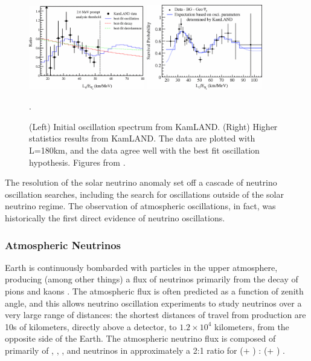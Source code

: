 \begin{figure}[htbp]
  \centering
  \includegraphics[width=0.45\textwidth]{intro_figures/kamland.png}
  \includegraphics[width=0.45\textwidth]{intro_figures/kamland_highstats.png}
  \caption[KamLAND Oscillation Results]{(Left) Initial oscillation spectrum from KamLAND. (Right) Higher statistics results from KamLAND.  The data are plotted with L=180km, and the data agree well with the best fit oscillation hypothesis. Figures from \cite{Araki:2004mb,Abe:2008aa}.}
  \label{fig:kamland}.
\end{figure}

The resolution of the solar neutrino anomaly set off a cascade of neutrino oscillation searches, including the search for oscillations outside of the solar neutrino regime.  The observation of atmospheric oscillations, in fact, was historically the first direct evidence of neutrino oscillations.

\subsubsection{Atmospheric Neutrinos}

Earth is continuously bombarded with particles in the upper atmosphere, producing (among other things) a flux of neutrinos primarily from the decay of pions and kaons \cite{Honda:2004yz, PhysRevD.70.023006, Plyaskin:2001ku}.  The atmospheric flux is often predicted as a function of zenith angle, and this allows neutrino oscillation experiments to study neutrinos over a very large range of distances: the shortest distances of travel from production are 10s of kilometers, directly above a detector, to $1.2 \times 10^4$ kilometers, from the opposite side of the Earth.  The atmospheric neutrino flux is composed of primarily of \numu, \numubar, \nue, and \nuebar neutrinos in approximately a 2:1 ratio for (\numu + \numubar) : (\nue + \nuebar) \cite{Agashe:2014kda}.

